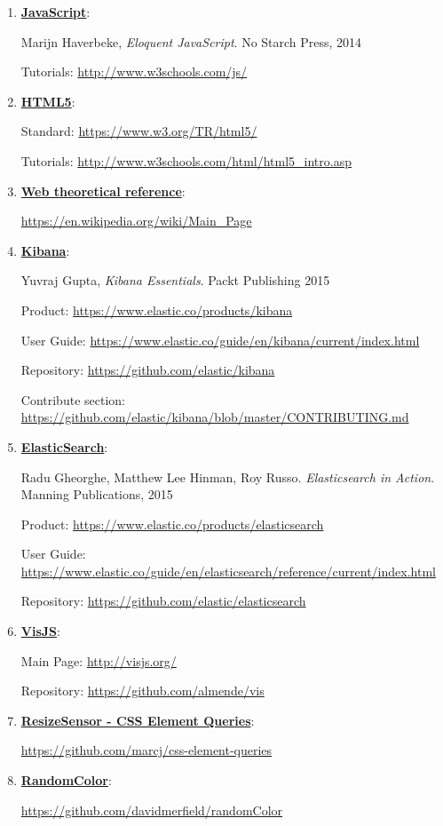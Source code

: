 \documentclass[a4paper, 12pt]{book}
\begin{document}
\begin{enumerate}
\item \underline{\textbf{JavaScript}}:

 Marijn Haverbeke, \textit{Eloquent JavaScript}. No Starch Press, 2014

Tutorials: \url{http://www.w3schools.com/js/}

\item \underline{\textbf{HTML5}}:

Standard: \url{https://www.w3.org/TR/html5/}

Tutorials: \url{http://www.w3schools.com/html/html5_intro.asp}

\item \underline{\textbf{Web theoretical reference}}: 

\url{https://en.wikipedia.org/wiki/Main_Page}

\item \underline{\textbf{Kibana}}:

 Yuvraj Gupta, \textit{Kibana Essentials}. Packt Publishing 2015

Product: \url{https://www.elastic.co/products/kibana}

User Guide: \url{https://www.elastic.co/guide/en/kibana/current/index.html}

Repository: \url{https://github.com/elastic/kibana}

Contribute section: \url{https://github.com/elastic/kibana/blob/master/CONTRIBUTING.md}

\item \underline{\textbf{ElasticSearch}}: 

 Radu Gheorghe, Matthew Lee Hinman, Roy Russo. \textit{Elasticsearch in Action}. Manning Publications, 2015

Product: \url{https://www.elastic.co/products/elasticsearch}

User Guide: \url{https://www.elastic.co/guide/en/elasticsearch/reference/current/index.html}

Repository: \url{https://github.com/elastic/elasticsearch}

\item \underline{\textbf{VisJS}}:

Main Page: \url{http://visjs.org/}

Repository: \url{https://github.com/almende/vis}

\item \underline{\textbf{ResizeSensor - CSS Element Queries}}:

\url{https://github.com/marcj/css-element-queries}

\item \underline{\textbf{RandomColor}}:

\url{https://github.com/davidmerfield/randomColor}

\end{enumerate}
\end{document}
